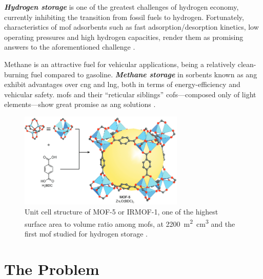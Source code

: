 \emph{\bfseries Hydrogen storage} is one of the greatest
challenges of hydrogen economy, currently inhibiting the transition from fossil
fuels to hydrogen. Fortunately, characteristics of \gls{mof} adsorbents such as
fast adsorption/desorption kinetics, low operating pressures and high hydrogen
capacities, render them as promising answers to the aforementioned challenge
\parencite{Suh2011, Suresh_2021}.

Methane is an attractive fuel for vehicular applications, being a relatively
clean-burning fuel compared to gasoline. \emph{\bfseries Methane
storage} in sorbents known as \gls{ang} exhibit
advantages over \gls{cng} and \gls{lng}, both in terms of energy-efficiency and
vehicular safety. \glspl{mof} \parencite{Ma2007, Spanopoulos_2016,
Tsangarakis2023} and their ``reticular siblings'' \glspl{cof}---composed only of light elements---show great promise as
\gls{ang} solutions \parencite{MendozaCortes2011, Furukawa_2009, Martin2014,
Tong2018}.

\begin{figure}
	\centering
	\includegraphics[width=0.7\textwidth]{fig/irmof-1.png}
	\caption[Unit cell structure of IRMOF-1.]{Unit cell structure of MOF-5 or
	IRMOF-1, one of the highest surface area to volume ratio
	among \glspl{mof}, at \SI{2200}{\square\meter\cubic\centi\meter} and the
	first \gls{mof} studied for hydrogen storage
	\parencite{Rosi2003}.}
	\label{fig:irmof-1}
\end{figure}

\section{The Problem}

